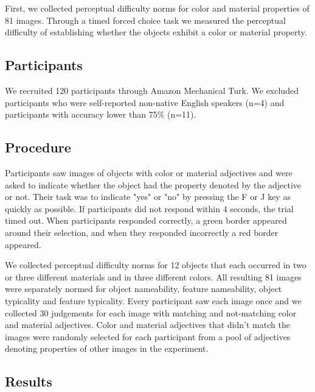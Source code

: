 \documentclass[12pt,letterpaper]{article}
\begin{document}
First, we collected perceptual difficulty norms for color and material properties of 81 images. Through a timed forced choice task we measured the perceptual difficulty of establishing whether the objects exhibit a color or material property.

\subsection{Participants} 

We recruited 120 participants through Amazon Mechanical Turk. We excluded participants who were self-reported non-native English speakers (n=4) and participants with accuracy lower than 75\% (n=11).

\subsection{Procedure} 

Participants saw images of objects with color or material adjectives and were asked to indicate whether the object had the property denoted by the adjective or not. Their task was to indicate "yes" or "no" by pressing the F or J key as quickly as possible. If participants did not respond within 4 seconds, the trial timed out. When participants responded correctly, a green border appeared around their selection, and when they responded incorrectly a red border appeared.

We collected perceptual difficulty norms for 12 objects that each occurred in two or three different materials and in three different colors. All resulting 81 images were separately normed for object nameability, feature nameability, object typicality and feature typicality. Every participant saw each image once and we collected 30 judgements for each image with matching and not-matching color and material adjectives. Color and material adjectives that didn't match the images were randomly selected for each participant from a pool of adjectives denoting properties of other images in the experiment.

\subsection{Results} 
\end{document}
